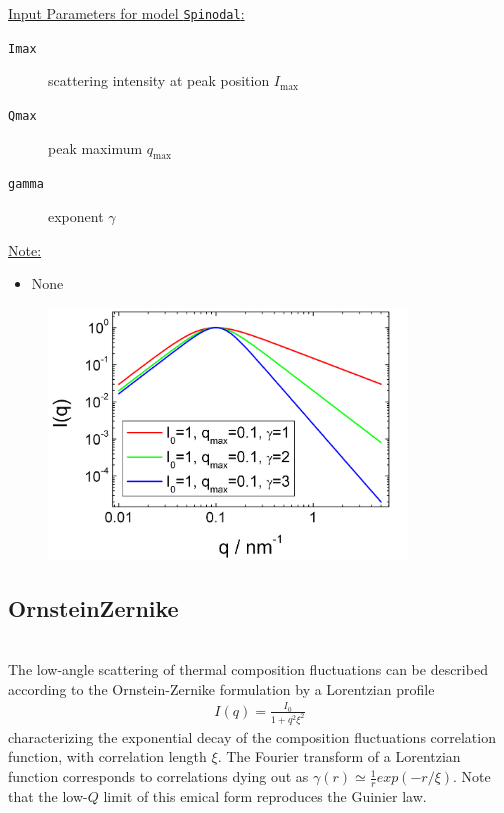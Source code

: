 \vspace{5mm}

\underline{Input Parameters for model \texttt{Spinodal}:}\\
\begin{description}
\item[\texttt{Imax}] scattering intensity at peak position $I_\text{max}$
\item[\texttt{Qmax}] peak maximum $q_\text{max}$
\item[\texttt{gamma}] exponent $\gamma$
\end{description}

\underline{Note:}
\begin{itemize}
\item None
\end{itemize}



\begin{figure}[htb]
\begin{center}
\includegraphics[width=0.85\textwidth,height=0.6\textwidth]{spinodalIQ.png}
\end{center}
\caption{} \label{fig:spinodalIQ}
\end{figure}

\clearpage
\subsection{OrnsteinZernike}
\label{sect:Zernike}
 ~\\
The low-angle scattering of thermal composition fluctuations can be
described according to the Ornstein-Zernike formulation by a
Lorentzian profile
\begin{align}
I(q) = \frac{I_0}{1+q^2\xi^2}
\end{align}
characterizing the exponential decay of the composition fluctuations
correlation function, with correlation length $\xi$. The Fourier
transform of a Lorentzian function corresponds to correlations dying
out as $\gamma(r) \simeq \frac{1}{r}exp(-r/\xi)$. Note that the
low-$Q$ limit of this emical form reproduces the Guinier law.


